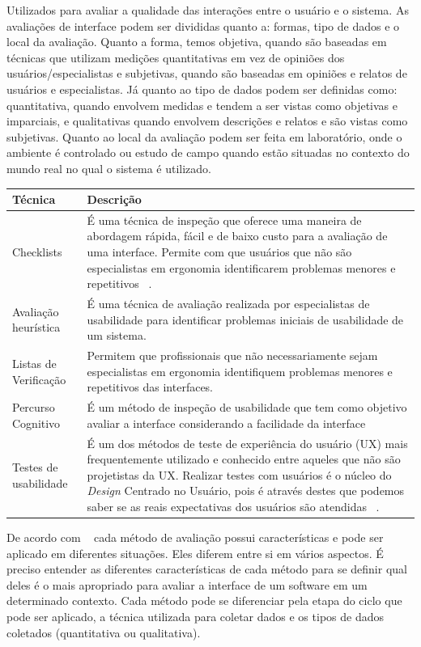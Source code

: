 Utilizados para avaliar a qualidade das interações entre o usuário e o sistema.
%
As avaliações de interface podem ser divididas quanto a: formas, tipo de dados e o local da avaliação. Quanto a forma, temos objetiva, quando são baseadas em técnicas que utilizam medições quantitativas em vez de opiniões dos usuários/especialistas e subjetivas, quando são baseadas em opiniões e relatos de usuários e especialistas. Já quanto ao tipo de dados podem ser definidas como: quantitativa, quando envolvem medidas e tendem a ser vistas como objetivas e imparciais, e qualitativas quando envolvem descrições e relatos e são vistas como subjetivas. Quanto ao local da avaliação podem ser feita em laboratório, onde o ambiente é controlado ou estudo de campo quando estão situadas no contexto do mundo real no qual o sistema é utilizado.


\begin{tabular}{|p{4cm}|p{8cm}|}
\hline 
Técnica & Descrição \\ 
\hline 
Checklists & É uma técnica de inspeção que oferece uma maneira de abordagem rápida, fácil e de baixo custo para a avaliação de uma interface. Permite com que usuários que não são especialistas em ergonomia identificarem problemas menores e repetitivos ~\cite{cybis2010}. \\ 
\hline 
Avaliação heurística & É uma técnica de avaliação realizada por especialistas de usabilidade para identificar problemas iniciais de usabilidade de um sistema. \\ 
\hline 
Listas de Verificação & Permitem que profissionais que não necessariamente sejam especialistas em ergonomia identifiquem problemas menores e repetitivos das interfaces. \\ 
\hline 
Percurso Cognitivo & É um método de inspeção de usabilidade que tem como objetivo avaliar a interface considerando a facilidade da interface \\ 
\hline 
Testes de usabilidade & É um dos métodos de teste de experiência do usuário (UX) mais frequentemente utilizado e conhecido entre aqueles que não são projetistas da UX. Realizar testes com usuários é o núcleo do \emph{Design} Centrado no Usuário, pois é através destes que podemos saber se as reais expectativas dos usuários são atendidas ~\cite{santos2012}. \\ 
\hline 
\end{tabular} 


De acordo com ~ cada método de avaliação possui características e pode ser aplicado em diferentes situações.
%
Eles diferem entre si em vários aspectos. É preciso entender as diferentes características de cada método para se definir qual deles é o mais apropriado para avaliar a interface de um software em um determinado contexto.
%
Cada método pode se diferenciar pela etapa do ciclo que pode ser aplicado, a técnica utilizada para coletar dados e os tipos de dados coletados (quantitativa ou qualitativa). 

